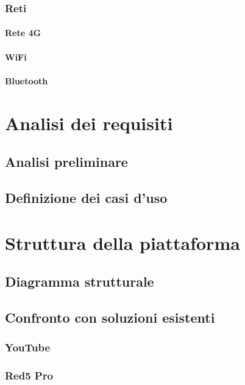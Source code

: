       \subsubsection{Reti}
         \paragraph{Rete 4G}   
         \paragraph{WiFi}
         \paragraph{Bluetooth}

\section{Analisi dei requisiti}
   \subsection{Analisi preliminare}
   
   \subsection{Definizione dei casi d'uso}
   
\section{Struttura della piattaforma}
   \subsection{Diagramma strutturale}

   \subsection{Confronto con soluzioni esistenti}
      \subsubsection{YouTube}
      \subsubsection{Red5 Pro}
